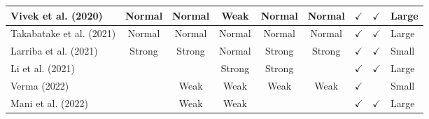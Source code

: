 \documentclass[../access.tex]{subfiles}
\begin{document}
\begin{table}[htbp]
\begin{adjustwidth}{-2cm}{}
\begin{tabular}{m{4.4cm} c c c c c c c >{\centering\arraybackslash}m{0.7cm}}
            \hline
            \footnotesize{Vivek et al. (2020) \cite{Vivek2020}}            & {Normal}                                                                                    & {Normal}                                         & {Weak}                 & {Normal}                     & {Normal}                  & $ \checkmark $          & $ \checkmark $            & \footnotesize{Large} \\
            \hline
            \footnotesize{Takabatake et al. (2021) \cite{Takabatake2021}}  & {Normal}                                                                                    & {Normal}                                         & {Normal}               & {Normal}                     & {Normal}                  & $ \checkmark $          & $ \checkmark $            & \footnotesize{Large} \\
            \hline
            \footnotesize{Larriba et al. (2021) \cite{Larriba2021}}        & {Strong}                                                                                    & {Strong}                                         & {Normal}               & {Strong}                     & {Strong}                  & $ \checkmark $          & $ \checkmark $            & \footnotesize{Small} \\
            \hline
            \footnotesize{Li et al. (2021) \cite{Li2021}}                  & {}                                                                                          & {}                                               & {Strong}               & {Strong}                     & {}                        & $ \checkmark $          & $ \checkmark $            & \footnotesize{Large} \\
            \hline
            \footnotesize{Verma (2022) \cite{Verma2022}}                   & {}                                                                                          & {Weak}                                           & {Weak}                 & {Weak}                       & {Weak}                    & $ \checkmark $          & {}                        & \footnotesize{Small} \\
            \hline
            \footnotesize{Mani et al. (2022) \cite{Mani2022}}              & {}                                                                                          & {Weak}                                           & {Weak}                 & {}                           & {}                        & $ \checkmark $          & $ \checkmark $            & \footnotesize{Large} \\

\end{tabular}
\end{adjustwidth}
\end{table}
\end{document}
